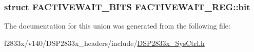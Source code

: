 \subsubsection[{bit}]{\setlength{\rightskip}{0pt plus 5cm}struct {\bf F\+A\+C\+T\+I\+V\+E\+W\+A\+I\+T\+\_\+\+B\+I\+T\+S} F\+A\+C\+T\+I\+V\+E\+W\+A\+I\+T\+\_\+\+R\+E\+G\+::bit}\label{union_f_a_c_t_i_v_e_w_a_i_t___r_e_g_ab9ddc5bbc54ac32460e14faf81728c09}


The documentation for this union was generated from the following file\+:\begin{DoxyCompactItemize}
\item 
f2833x/v140/\+D\+S\+P2833x\+\_\+headers/include/\hyperlink{_d_s_p2833x___sys_ctrl_8h}{D\+S\+P2833x\+\_\+\+Sys\+Ctrl.\+h}\end{DoxyCompactItemize}
